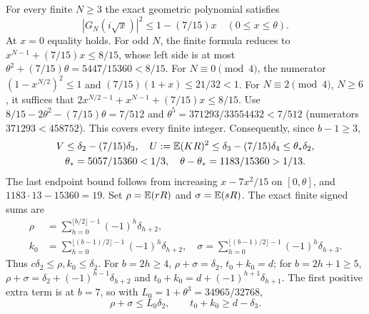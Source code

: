 For every finite $N\ge3$ the exact geometric polynomial satisfies
\begin{equation}\tag{L38.2.3}\label{eq:L38:finiteG}
|G_N(i\sqrt x)|^2\le1-(7/15)x\quad(0\le x\le\theta).
\end{equation}
At $x=0$ equality holds. For odd $N$, the finite formula reduces to
$x^{N-1}+(7/15)x\le8/15$, whose left side is at most
$\theta^2+(7/15)\theta=5447/15360<8/15$.
For $N\equiv0\pmod4$, the numerator $(1-x^{N/2})^2\le1$ and
$(7/15)(1+x)\le21/32<1$.
For $N\equiv2\pmod4$, $N\ge6$, it suffices that
$2x^{N/2-1}+x^{N-1}+(7/15)x\le8/15$.
Use $8/15-2\theta^2-(7/15)\theta=7/512$ and
$\theta^5=371293/33554432<7/512$ (numerators $371293<458752$).
This covers every finite integer.
Consequently, since $b-1\ge3$,
\[
\begin{gathered}
V\le\delta_2-(7/15)\delta_3,\quad
U:=\mathbb E(KR)^2\le\delta_3-(7/15)\delta_4\le\theta_*\delta_2,\\
\theta_*=5057/15360<1/3,\quad\theta-\theta_*=1183/15360>1/13.
\end{gathered}
\]
The last endpoint bound follows from increasing $x-7x^2/15$ on
$[0,\theta]$, and $1183\cdot13-15360=19$.
Set $\rho=\mathbb E(rR)$ and $\sigma=\mathbb E(sR)$.
The exact finite signed sums are
\[
\begin{aligned}
\rho&=\sum_{h=0}^{\lfloor b/2\rfloor-1}(-1)^h\delta_{h+2},\\
k_0&=\sum_{h=0}^{\lfloor(b-1)/2\rfloor-1}(-1)^h\delta_{h+2},\quad
\sigma=\sum_{h=0}^{\lfloor(b-1)/2\rfloor-1}(-1)^h\delta_{h+3}.
\end{aligned}
\]
Thus $c\delta_2\le\rho,k_0\le\delta_2$.
For $b=2h\ge4$, $\rho+\sigma=\delta_2$, $t_0+k_0=d$;
for $b=2h+1\ge5$,
$\rho+\sigma=\delta_2+(-1)^{h-1}\delta_{h+2}$ and
$t_0+k_0=d+(-1)^{h+1}\delta_{h+1}$.
The first positive extra term is at $b=7$, so with
$L_0=1+\theta^3=34965/32768$,
\begin{equation}\tag{L38.2.8}\label{eq:L38:jointmeans}
\rho+\sigma\le L_0\delta_2,\qquad t_0+k_0\ge d-\delta_3.
\end{equation}

